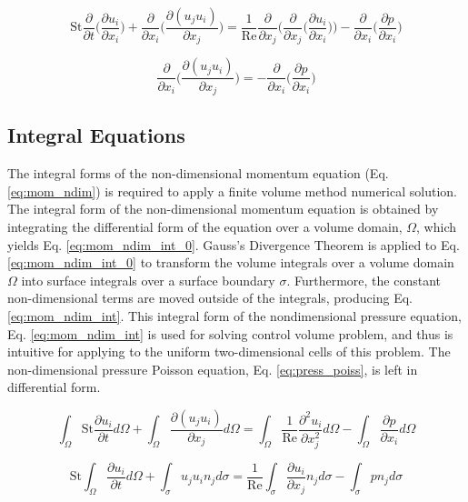 \documentclass[10pt, letterpaper]{article}
\begin{document}
\begin{equation}
  \text{St}\frac{\partial}{\partial{t}}\bigg(\frac{\partial{u_{i}}}{\partial{x_{i}}}\bigg) + \frac{\partial}{\partial{x_{i}}}\bigg(\frac{\partial{(u_{j}u_{i})}}{\partial{x_{j}}}\bigg) = \frac{1}{\text{Re}}\frac{\partial}{\partial{x_{j}}}\bigg(\frac{\partial}{\partial{x_{j}}}\bigg(\frac{\partial{u_{i}}}{\partial{x_{i}}}\bigg)\bigg) -\frac{\partial}{\partial{x_{i}}}\bigg(\frac{\partial{p}}{\partial{x_{i}}}\bigg)
  \label{eq:mom_ndim_div_simp}
\end{equation}

\begin{equation}
  \boxed{
    \frac{\partial}{\partial{x_{i}}}\bigg(\frac{\partial(u_{j}u_{i})}{\partial{x_{j}}}\bigg) = - \frac{\partial}{\partial{x_{i}}}\bigg(\frac{\partial{p}}{\partial{x_{i}}}\bigg)
  }
  \label{eq:press_poiss}
\end{equation}


\subsection{Integral Equations}

The integral forms of the non-dimensional momentum equation (Eq. \ref{eq:mom_ndim}) is required to apply a finite volume method numerical solution. The integral form of the non-dimensional momentum equation is obtained by integrating the differential form of the equation over a volume domain, $\Omega$, which yields Eq. \ref{eq:mom_ndim_int_0}. Gauss's Divergence Theorem is applied to Eq. \ref{eq:mom_ndim_int_0} to transform the volume integrals over a volume domain $\Omega$ into surface integrals over a surface boundary $\sigma$. Furthermore, the constant non-dimensional terms are moved outside of the integrals, producing Eq. \ref{eq:mom_ndim_int}. This integral form of the nondimensional pressure equation, Eq. \ref{eq:mom_ndim_int} is used for solving control volume problem, and thus is intuitive for applying to the uniform two-dimensional cells of this problem. The non-dimensional pressure Poisson equation, Eq. \ref{eq:press_poiss}, is left in differential form. 

\begin{equation}
  \int_{\Omega}\text{St}\frac{\partial{u_{i}}}{\partial{t}}d\Omega + \int_{\Omega}\frac{\partial(u_{j}u_{i})}{\partial{x_{j}}}d\Omega = \int_{\Omega}\frac{1}{\text{Re}}\frac{\partial^{2}u_{i}}{\partial{x_{j}^{2}}}d\Omega - \int_{\Omega}\frac{\partial{p}}{\partial{x_{i}}}d\Omega
  \label{eq:mom_ndim_int_0}
\end{equation}

\begin{equation}
  \boxed{\text{St}\int_{\Omega}\frac{\partial{u_{i}}}{\partial{t}}d\Omega + \int_{\sigma}{u_{j}u_{i}n_{j}}d\sigma = \frac{1}{\text{Re}}\int_{\sigma}\frac{\partial{u_{i}}}{\partial{x_{j}}}n_{j}d\sigma - \int_{\sigma}{pn_{j}}d\sigma}
  \label{eq:mom_ndim_int}
\end{equation}

\printbibliography{}
\end{document}

